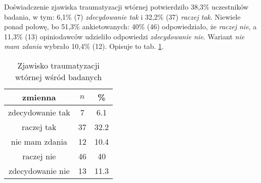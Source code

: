Doświadczenie zjawiska traumatyzacji wtórnej potwierdziło 38,3\% uczestników badania, w tym: 6,1\% (7) \textit{zdecydowanie tak} i 32,2\% (37) \textit{raczej tak}. Niewiele ponad połowę, bo  51,3\% ankietowanych: 40\% (46) odpowiedziało, że \textit{raczej nie}, a  11,3\% (13) opiniodawców udzieliło odpowiedzi \textit{zdecydowanie nie}. Wariant \textit{nie mam zdania} wybrało 10,4\% (12). Opisuje to tab. \ref{tab:Q11}.


\begin{table}[H]
\caption{Zjawisko traumatyzacji wtórnej wśród badanych}
\centering
\begin{tabular}{ | c | c | c |}
\hline
zmienna & $n$ & \% \\
\hline
zdecydowanie tak  &  7  & 6.1 \\
\hline
raczej tak  &  37  & 32.2\\
\hline
nie mam zdania  &  12  & 10.4\\
\hline
raczej nie  &  46  & 40 \\
\hline
zdecydowanie nie  &  13  & 11.3\\
\hline
\end{tabular}
\label{tab:Q11}
\end{table}